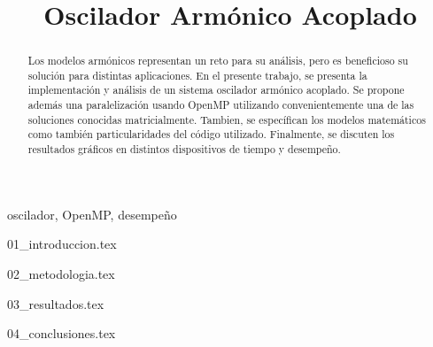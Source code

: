 \documentclass[conference]{IEEEtran}
\begin{document}
\title{Oscilador Armónico Acoplado}

\author{
}
	
\maketitle
	
\begin{abstract}
	Los modelos armónicos representan un reto para su análisis, pero es beneficioso su solución para distintas aplicaciones. En el presente trabajo, se presenta la implementación y análisis de un sistema oscilador armónico acoplado. Se propone además una paralelización usando OpenMP utilizando convenientemente una de las soluciones conocidas matricialmente. Tambien, se específican los modelos matemáticos como también particularidades del código utilizado. Finalmente, se discuten los resultados gráficos en distintos dispositivos de tiempo y desempeño.
\end{abstract}
	
\begin{IEEEkeywords}
	oscilador, OpenMP, desempeño
\end{IEEEkeywords}
	
{01_introduccion.tex}
	
{02_metodologia.tex}
	
{03_resultados.tex}
	
{04_conclusiones.tex}

	
\renewcommand{\refname}{Referencias}


	
\end{document}
